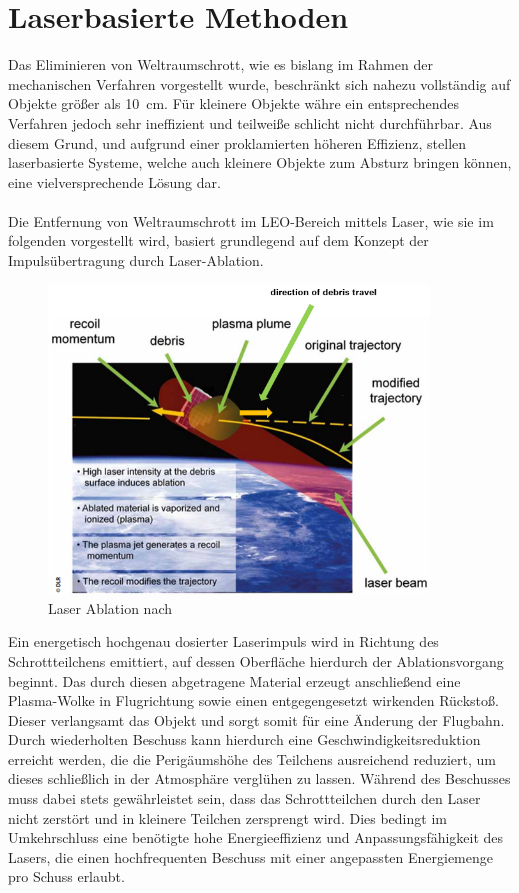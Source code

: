 \documentclass{article}
\begin{document}
\section{Laserbasierte Methoden}\label{sec:laser}
Das Eliminieren von Weltraumschrott, wie es bislang im Rahmen der mechanischen Verfahren vorgestellt wurde, beschränkt sich nahezu vollständig auf Objekte größer als \SI{10}{\centi\meter}. Für kleinere Objekte währe ein entsprechendes Verfahren jedoch sehr ineffizient und teilweiße schlicht nicht durchführbar. Aus diesem Grund, und aufgrund einer proklamierten höheren Effizienz, stellen laserbasierte Systeme, welche auch kleinere Objekte zum Absturz bringen können, eine vielversprechende Lösung dar.\\\\
Die Entfernung von Weltraumschrott im LEO-Bereich mittels Laser, wie sie im folgenden vorgestellt wird, basiert grundlegend auf dem Konzept der Impulsübertragung durch Laser-Ablation. 
\begin{figure}[H]
	\centering
	\includegraphics[width = 0.9\textwidth]{images/ablation mod.png}
	\caption{Laser Ablation nach \citet{eckel2016laser}}
	\label{ablschema}
\end{figure}
\noindent
Ein energetisch hochgenau dosierter Laserimpuls wird in Richtung des Schrottteilchens emittiert, auf dessen Oberfläche hierdurch der Ablationsvorgang beginnt. Das durch diesen abgetragene Material erzeugt anschließend eine Plasma-Wolke in Flugrichtung sowie einen entgegengesetzt wirkenden Rückstoß. Dieser verlangsamt das Objekt und sorgt somit für eine Änderung der Flugbahn. Durch wiederholten Beschuss kann hierdurch eine Geschwindigkeitsreduktion erreicht werden, die die Perigäumshöhe des Teilchens ausreichend reduziert, um dieses schließlich in der Atmosphäre verglühen zu lassen. Während des Beschusses muss dabei stets gewährleistet sein, dass das Schrottteilchen durch den Laser nicht zerstört und in kleinere Teilchen zersprengt wird. Dies bedingt im Umkehrschluss eine benötigte hohe Energieeffizienz und Anpassungsfähigkeit des Lasers, die einen hochfrequenten Beschuss mit einer angepassten Energiemenge pro Schuss erlaubt.\\\\
\end{document}

